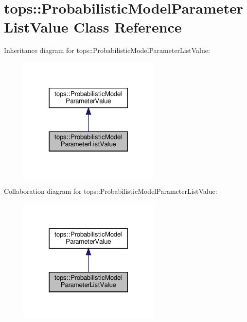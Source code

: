 \hypertarget{classtops_1_1ProbabilisticModelParameterListValue}{}\section{tops\+:\+:Probabilistic\+Model\+Parameter\+List\+Value Class Reference}
\label{classtops_1_1ProbabilisticModelParameterListValue}


Inheritance diagram for tops\+:\+:Probabilistic\+Model\+Parameter\+List\+Value\+:
\nopagebreak
\begin{figure}[H]
\begin{center}
\leavevmode
\includegraphics[width=201pt]{classtops_1_1ProbabilisticModelParameterListValue__inherit__graph}
\end{center}
\end{figure}


Collaboration diagram for tops\+:\+:Probabilistic\+Model\+Parameter\+List\+Value\+:
\nopagebreak
\begin{figure}[H]
\begin{center}
\leavevmode
\includegraphics[width=201pt]{classtops_1_1ProbabilisticModelParameterListValue__coll__graph}
\end{center}
\end{figure}
